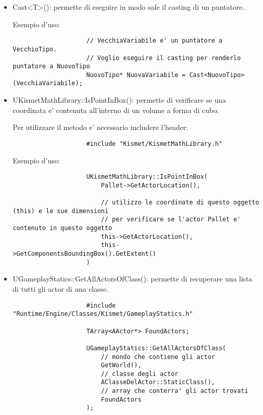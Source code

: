         \begin{itemize}
            \item Cast<T>(): permette di eseguire in modo safe il casting di un puntatore.

                Esempio d'uso:
                \begin{verbatim}
                    // VecchiaVariabile e' un puntatore a VecchioTipo.
                    // Voglio eseguire il casting per renderlo puntatore a NuovoTipo
                    NuovoTipo* NuovaVariabile = Cast<NuovoTipo>(VecchiaVariabile);
                \end{verbatim}

            \item UKismetMathLibrary::IsPointInBox(): permette di verificare se una coordinata e' contenuta all'interno di un volume a forma di cubo.

                Per utilizzare il metodo e' necessario includere l'header:
                \begin{verbatim}
                    #include "Kismet/KismetMathLibrary.h"
                \end{verbatim}

                Esempio d'uso:
                \begin{verbatim}
                    UKismetMathLibrary::IsPointInBox(
                        Pallet->GetActorLocation(),

                        // utilizzo le coordinate di questo oggetto (this) e le sue dimensioni
                        // per verificare se l'actor Pallet e' contenuto in questo oggetto
                        this->GetActorLocation(),
                        this->GetComponentsBoundingBox().GetExtent()
                    )
                \end{verbatim}

            \item UGameplayStatics::GetAllActorsOfClass(): permette di recuperare una lista di tutti gli actor di una classe.

                \begin{verbatim}
                    #include "Runtime/Engine/Classes/Kismet/GameplayStatics.h"

                    TArray<AActor*> FoundActors;

                    UGameplayStatics::GetAllActorsOfClass(
                        // mondo che contiene gli actor
                        GetWorld(),
                        // classe degli actor
                        AClasseDelActor::StaticClass(),
                        // array che conterra' gli actor trovati
                        FoundActors
                    );
                \end{verbatim}


\end{itemize}
